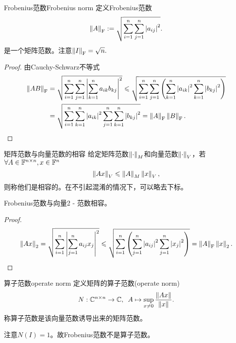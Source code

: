 \begin{example}
    {Frobenius范数}{Frobenius norm}
    定义Frobenius范数
    \begin{equation}
        \left\lVert A\right\rVert_{\mathrm F}:=\sqrt{\sum_{i=1}^n\sum_{j=1}^n\left\lvert a_{ij}\right\rvert^2}.
    \end{equation}
    是一个矩阵范数。注意$\left\lVert I\right\rVert_{\mathrm F}=\sqrt n.$
    \begin{proof}
        由Cauchy-Schwarz不等式
        \begin{align*}
            \left\lVert AB\right\rVert_{\mathrm F}&=\sqrt{\sum_{i=1}^n\sum_{j=1}^n\left\lvert\sum_{k=1}^na_{ik}b_{kj}\right\rvert^2}\leqslant\sqrt{\sum_{i=1}^n\sum_{j=1}^n\left(\sum_{k=1}^n\left\lvert a_{ik}\right\rvert^2\sum_{k=1}^n\left\lvert b_{kj}\right\rvert^2\right)}\\
            &=\sqrt{\sum_{i=1}^n\sum_{k=1}^n\left\lvert a_{ik}\right\rvert^2\sum_{j=1}^n\sum_{k=1}^n\left\lvert b_{kj}\right\rvert^2}=\left\lVert A\right\rVert_{\mathrm F}\left\lVert B\right\rVert_{\mathrm F}.
            \qedhere
        \end{align*}
    \end{proof}
\end{example}

\begin{definition}
    {矩阵范数与向量范数的相容}{}
    给定矩阵范数$\left\lVert\cdot\right\rVert_M$和向量范数$\left\lVert\cdot\right\rVert_V$，若$\forall A\in\mathbb F^{n\times n},x\in\mathbb F^n$ 
    \begin{equation}
        \left\lVert Ax\right\rVert_V\leqslant\left\lVert A\right\rVert_M\left\lVert x\right\rVert_V,
    \end{equation}
    则称他们是相容的。在不引起混淆的情况下，可以略去下标。
\end{definition}

\begin{example}
    {}{}
    Frobenius范数与向量2 - 范数相容。
    \begin{proof}
        \[
            \left\lVert Ax\right\rVert_2=\sqrt{\sum_{i=1}^n\left\lvert\sum_{j=1}^n a_{ij}x_j\right\rvert^2}\leqslant\sqrt{\sum_{i=1}^n\left(\sum_{j=1}^n\left\lvert a_{ij}\right\rvert^2\sum_{j=1}^n\left\lvert x_j\right\rvert^2\right)}=\left\lVert A\right\rVert_{\mathrm F}\left\lVert x\right\rVert_2.
            \qedhere
        \]
    \end{proof}
\end{example}

\begin{definition}
    {算子范数}{operate norm}
    定义矩阵的算子范数(operate norm)
    \begin{equation}
        N:\mathbb C^{n\times n}\to\mathbb C,\enspace A\mapsto\sup_{x\neq 0}\frac{\left\lVert Ax\right\rVert}{\left\lVert x\right\rVert}.
    \end{equation}
    称算子范数是该向量范数诱导出来的矩阵范数。
\end{definition}

注意$N(I)=1$。故Frobenius范数不是算子范数。


